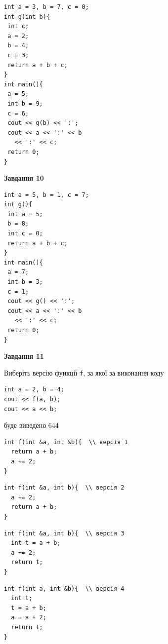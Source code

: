 \documentclass[12pt, ukrainian]{article}
\def\code#1{\Verb!#1!}
\begin{document}
{\begin {large}
\begin{minipage}[t]{7.0cm}
\begin{verbatim}
int a = 3, b = 7, c = 0;
int g(int b){
 int c;
 a = 2;
 b = 4;
 c = 3;
 return a + b + c;
}
int main(){
 a = 5;
 int b = 9;
 c = 6;
 cout << g(b) << ':';
 cout << a << ':' << b 
   << ':' << c;
 return 0;
}
\end{verbatim}



\begin{center}
\textbf{Завдання 10}
\end{center}
\vspace{-8mm}

\begin{verbatim}
int a = 5, b = 1, c = 7;
int g(){
 int a = 5;
 b = 8;
 int c = 0;
 return a + b + c;
}
int main(){
 a = 7;
 int b = 3;
 c = 1;
 cout << g() << ':';
 cout << a << ':' << b 
   << ':' << c;
 return 0;
}
\end{verbatim}

\end{minipage}
\vline \hspace{1mm}
\begin{minipage}[t]{11.0cm}

\begin{center}
\textbf{Завдання 11}
\end{center}
Виберіть версію функції \code{f}, за якої за виконання коду
\begin{verbatim}
int a = 2, b = 4;
cout << f(a, b);
cout << a << b;
\end{verbatim}

буде виведено 644

\begin{verbatim}
int f(int &a, int &b){  \\ версія 1
  return a + b;
  a += 2;
}
\end{verbatim}

\vspace{-8mm}\begin{verbatim}
int f(int &a, int b){  \\ версія 2
  a += 2;
  return a + b;
}
\end{verbatim}

\vspace{-8mm}\begin{verbatim}
int f(int &a, int b){  \\ версія 3
  int t = a + b;
  a += 2;
  return t;
}
\end{verbatim}

\vspace{-8mm}\begin{verbatim}
int f(int a, int &b){  \\ версія 4
  int t;
  t = a + b;
  a = a + 2;
  return t;
}
\end{verbatim}




\end{minipage}
\end{large}}
\end{document}
